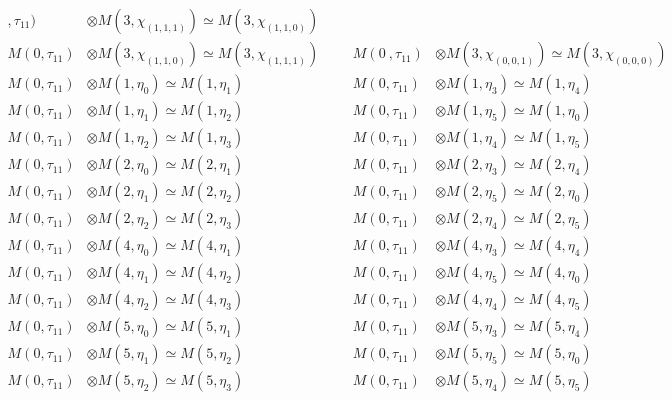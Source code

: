 \begin{align*}
,\tau_{11}) &\otimes M(3,\chi_{(1,1,1)}) \simeq M(3,\chi_{(1,1,0)})\\
M(0,\tau_{11}) &\otimes M(3,\chi_{(1,1,0)}) \simeq M(3,\chi_{(1,1,1)}) &&& M(0\
,\tau_{11}) &\otimes M(3,\chi_{(0,0,1)}) \simeq M(3,\chi_{(0,0,0)})\\
M(0,\tau_{11}) &\otimes M(1,\eta_{0}) \simeq M(1,\eta_{1}) &&& M(0,\tau_{11}) \
&\otimes M(1,\eta_{3}) \simeq M(1,\eta_{4})\\
M(0,\tau_{11}) &\otimes M(1,\eta_{1}) \simeq M(1,\eta_{2}) &&& M(0,\tau_{11}) \
&\otimes M(1,\eta_{5}) \simeq M(1,\eta_{0})\\
M(0,\tau_{11}) &\otimes M(1,\eta_{2}) \simeq M(1,\eta_{3}) &&& M(0,\tau_{11}) \
&\otimes M(1,\eta_{4}) \simeq M(1,\eta_{5})\\
M(0,\tau_{11}) &\otimes M(2,\eta_{0}) \simeq M(2,\eta_{1}) &&& M(0,\tau_{11}) \
&\otimes M(2,\eta_{3}) \simeq M(2,\eta_{4})\\
M(0,\tau_{11}) &\otimes M(2,\eta_{1}) \simeq M(2,\eta_{2}) &&& M(0,\tau_{11}) \
&\otimes M(2,\eta_{5}) \simeq M(2,\eta_{0})\\
M(0,\tau_{11}) &\otimes M(2,\eta_{2}) \simeq M(2,\eta_{3}) &&& M(0,\tau_{11}) \
&\otimes M(2,\eta_{4}) \simeq M(2,\eta_{5})\\
M(0,\tau_{11}) &\otimes M(4,\eta_{0}) \simeq M(4,\eta_{1}) &&& M(0,\tau_{11}) \
&\otimes M(4,\eta_{3}) \simeq M(4,\eta_{4})\\
M(0,\tau_{11}) &\otimes M(4,\eta_{1}) \simeq M(4,\eta_{2}) &&& M(0,\tau_{11}) \
&\otimes M(4,\eta_{5}) \simeq M(4,\eta_{0})\\
M(0,\tau_{11}) &\otimes M(4,\eta_{2}) \simeq M(4,\eta_{3}) &&& M(0,\tau_{11}) \
&\otimes M(4,\eta_{4}) \simeq M(4,\eta_{5})\\
M(0,\tau_{11}) &\otimes M(5,\eta_{0}) \simeq M(5,\eta_{1}) &&& M(0,\tau_{11}) \
&\otimes M(5,\eta_{3}) \simeq M(5,\eta_{4})\\
M(0,\tau_{11}) &\otimes M(5,\eta_{1}) \simeq M(5,\eta_{2}) &&& M(0,\tau_{11}) \
&\otimes M(5,\eta_{5}) \simeq M(5,\eta_{0})\\
M(0,\tau_{11}) &\otimes M(5,\eta_{2}) \simeq M(5,\eta_{3}) &&& M(0,\tau_{11}) \
&\otimes M(5,\eta_{4}) \simeq M(5,\eta_{5})\\
\end{align*}

